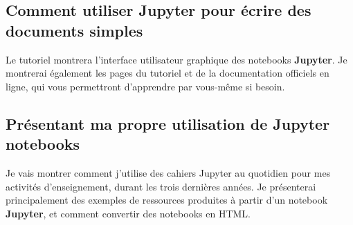 \documentclass[runningheads]{llncs}
\newcommand{\Jupyter}{\textbf{Jupyter}}
\begin{document}
\subsection*{Comment utiliser \Jupyter{} pour écrire des documents simples}

Le tutoriel montrera l'interface utilisateur graphique des notebooks \Jupyter{}.
Je montrerai également les pages du tutoriel et de la documentation officiels en ligne, qui vous permettront d'apprendre par vous-même si besoin.


\subsection*{Présentant ma propre utilisation de Jupyter{} notebooks}

Je vais montrer comment j'utilise des cahiers Jupyter au quotidien pour mes activités d'enseignement, durant les trois dernières années.
Je présenterai principalement des exemples de ressources produites à partir d'un notebook \Jupyter{}, et comment convertir des notebooks en HTML.
\end{document}
